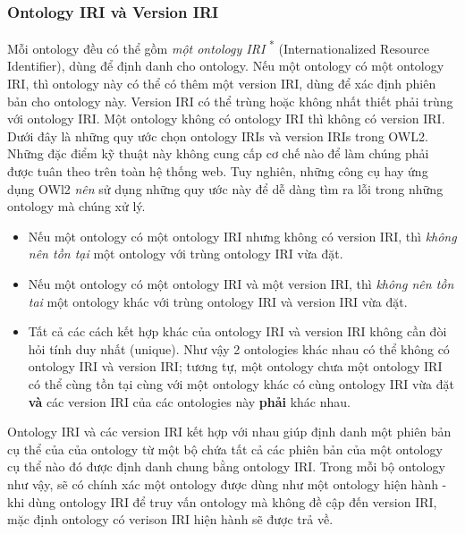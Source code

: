 \subsubsection{Ontology IRI và Version IRI}
Mỗi ontology đều có thể gồm \textit{một ontology IRI} \cite{iri} \textsuperscript{*} (Internationalized Resource Identifier), dùng để định danh cho ontology. Nếu một ontology có một ontology IRI, thì ontology này có thể có thêm một version IRI, dùng để xác định phiên bản cho ontology này. Version IRI có thể trùng hoặc không nhất thiết phải trùng với ontology IRI. Một ontology không có ontology IRI thì không có version IRI.
Dưới đây là những quy ước chọn ontology IRIs và version IRIs trong OWL2. Những đặc điểm kỹ thuật này không cung cấp cơ chế nào để làm chúng phải được tuân theo trên toàn hệ thống web. Tuy nghiên, những công cụ hay ứng dụng OWl2 \textit{nên} sử dụng những quy ước này để dễ dàng tìm ra lỗi trong những ontology mà chúng xử lý.
{\let\thefootnote\relax{}
}
\begin{itemize}
	\item Nếu một ontology có một ontology IRI nhưng không có version IRI, thì \textit{không nên tồn tại} một ontology với trùng ontology IRI vừa đặt.
	\item Nếu một ontology có một ontology IRI và một version IRI, thì \textit{không nên tồn tai} một ontology khác với trùng ontology IRI và version IRI vừa đặt.
	\item Tất cả các cách kết hợp khác của ontology IRI và version IRI không cần đòi hỏi tính duy nhất (unique). Như vậy 2 ontologies khác nhau có thể không có ontology IRI và version IRI; tương tự, một ontology chưa một ontology IRI có thể cùng tồn tại cùng với một ontology khác có cùng ontology IRI vừa đặt \textbf{và} các version IRI của các ontologies này \textbf{phải} khác nhau.
\end{itemize}
Ontology IRI và các version IRI kết hợp với nhau giúp định danh một phiên bản cụ thể của của ontology từ một bộ chứa tất cả các phiên bản của một ontology cụ thể nào đó được định danh chung bằng ontology IRI. Trong mỗi bộ ontology như vậy, sẽ có chính xác một ontology được dùng như một ontology hiện hành - khi dùng ontology IRI để truy vấn ontology mà không đề cập đến version IRI, mặc định ontology có verison IRI hiện hành sẽ được trả về.


